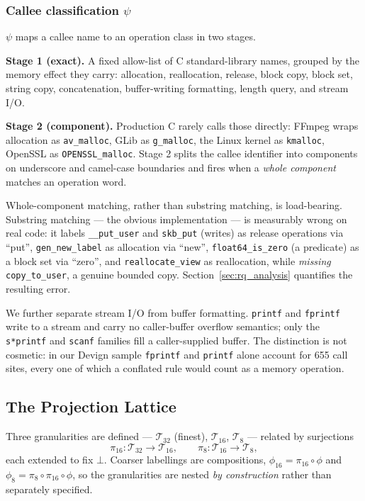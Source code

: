 \documentclass[pdflatex,sn-basic]{sn-jnl}
\theoremstyle{thmstyleone}%
\begin{document}
\subsubsection{Callee classification $\psi$}
\label{sec:psi}

$\psi$ maps a callee name to an operation class in two stages.

\textbf{Stage 1 (exact).} A fixed allow-list of C standard-library names,
grouped by the memory effect they carry: allocation, reallocation, release,
block copy, block set, string copy, concatenation, buffer-writing formatting,
length query, and stream I/O.

\textbf{Stage 2 (component).} Production C rarely calls those directly:
FFmpeg wraps allocation as \texttt{av\_malloc}, GLib as \texttt{g\_malloc},
the Linux kernel as \texttt{kmalloc}, OpenSSL as \texttt{OPENSSL\_malloc}.
Stage 2 splits the callee identifier into components on underscore and
camel-case boundaries and fires when a \emph{whole component} matches an
operation word.

Whole-component matching, rather than substring matching, is load-bearing.
Substring matching --- the obvious implementation --- is measurably wrong on
real code: it labels \texttt{\_\_put\_user} and \texttt{skb\_put} (writes) as
release operations via ``put'', \texttt{gen\_new\_label} as allocation via
``new'', \texttt{float64\_is\_zero} (a predicate) as a block set via ``zero'',
and \texttt{reallocate\_view} as reallocation, while \emph{missing}
\texttt{copy\_to\_user}, a genuine bounded copy.
Section~\ref{sec:rq_analysis} quantifies the resulting error.

We further separate stream I/O from buffer formatting. \texttt{printf} and
\texttt{fprintf} write to a stream and carry no caller-buffer overflow
semantics; only the \texttt{s*printf} and \texttt{scanf} families fill a
caller-supplied buffer. The distinction is not cosmetic: in our Devign sample
\texttt{fprintf} and \texttt{printf} alone account for 655 call sites, every
one of which a conflated rule would count as a memory operation.

\subsection{The Projection Lattice}
\label{sec:lattice}

Three granularities are defined --- $\mathcal{T}_{32}$ (finest),
$\mathcal{T}_{16}$, $\mathcal{T}_{8}$ --- related by surjections
\begin{equation}
    \pi_{16} : \mathcal{T}_{32} \to \mathcal{T}_{16}, \qquad
    \pi_{8}  : \mathcal{T}_{16} \to \mathcal{T}_{8},
\label{eq:projections}
\end{equation}
each extended to fix $\bot$. Coarser labellings are compositions,
$\phi_{16} = \pi_{16} \circ \phi$ and
$\phi_{8} = \pi_8 \circ \pi_{16} \circ \phi$, so the granularities are nested
\emph{by construction} rather than separately specified.
\end{document}
